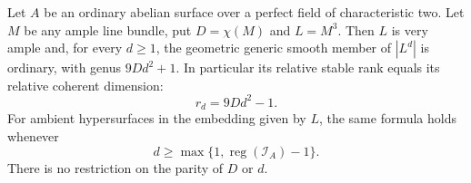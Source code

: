 \begin{theorem}
\label{thm:DE-A3-ordinary-all-ranks}
Let $A$ be an ordinary abelian surface over a perfect field of
characteristic two.  Let $M$ be any ample line bundle, put
$D=\chi(M)$ and $L=M^3$.  Then $L$ is very ample and, for every
$d\ge1$, the geometric generic smooth member of $|L^d|$ is ordinary,
with genus $9Dd^2+1$.  In particular its relative stable rank equals
its relative coherent dimension:
\[
                              r_d=9Dd^2-1.
\]
For ambient hypersurfaces in the embedding given by $L$, the same
formula holds whenever
\[
               d\ge\max\{1,\operatorname{reg}(\mathcal I_A)-1\}.
\]
There is no restriction on the parity of $D$ or $d$.
\end{theorem}
